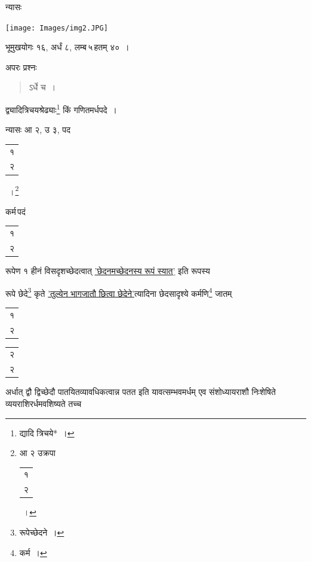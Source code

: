 \documentclass[10pt, openany]{book}
\begin{document}
{न्यासः\textendash 

\hspace{15mm} \texttt{[image: Images/img2.JPG]}

{भूमुखयोगः १६, अर्धं ८, लम्ब\textendash \,५\textendash \,हतम् ४०~।}
\vspace{3mm}

{अपरः प्रश्नः\textemdash}

\begin{quote}
\hspace{3cm} {\eg ऽर्धे च~।}
\end{quote}

{द्व्यादित्रिचयश्रेढ्याः\renewcommand{\thefootnote}{\s ३}\footnote{\s द्यादि त्रिचये*~।} किं गणितमर्धपदे~।}
\vspace{3mm}

{न्यासः\textendash \hspace{4mm} आ २, उ ३, पद \begin{tabular}{|c|}१\\ २\\ \hline \end{tabular}~।\renewcommand{\thefootnote}{\s ४}\footnote{\s आ २ उक्रपा
\begin{tabular}{|c|}१\\ २\\\hline \end{tabular}~।}}
\vspace{2mm}

{कर्म\textendash \,पदं\begin{tabular}{r}१ \\
२ \end{tabular}रूपेण १ हीनं विसदृशच्छेदत्वात् \hyperref[32.1]{'छेदनमच्छेदनस्य रूपं स्यात्'} इति रूपस्य}
{रूपे छेदे\renewcommand{\thefootnote}{\s ५}\footnote{\s रूपेच्छेदने~।} कृते \hyperref[36]{'तुल्येन भागजातौ छित्वा छेदेने'}त्यादिना छेदसादृश्ये
कर्मणि\renewcommand{\thefootnote}{\s ६}\footnote{\s कर्म~।} जातम् \begin{tabular}{|r} १\\ २\\\hline \end{tabular} \hspace{-5mm} \begin{tabular}{r|} २\\ २\\\hline \end{tabular}}
{अर्धात् द्वौ द्विच्छेदौ पातयितव्यावधिकत्वान्न पतत इति यावत्सम्भवमर्धम् एव
संशोध्यायराशौ}
{निःशेषिते व्ययराशिरर्धमवशिष्यते तच्च}
\vspace{2mm}

}
\end{document}
